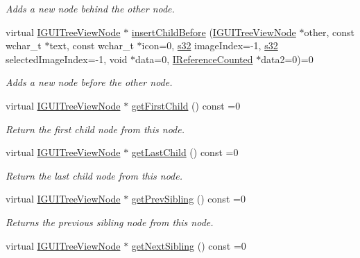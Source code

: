 \begin{DoxyCompactItemize}
\begin{DoxyCompactList}\small\item\em Adds a new node behind the other node. \end{DoxyCompactList}\item 
virtual \hyperlink{classirr_1_1gui_1_1IGUITreeViewNode}{I\+G\+U\+I\+Tree\+View\+Node} $\ast$ \hyperlink{classirr_1_1gui_1_1IGUITreeViewNode_adc7214ae72e9dae555348022b6568b7d}{insert\+Child\+Before} (\hyperlink{classirr_1_1gui_1_1IGUITreeViewNode}{I\+G\+U\+I\+Tree\+View\+Node} $\ast$other, const wchar\+\_\+t $\ast$text, const wchar\+\_\+t $\ast$icon=0, \hyperlink{namespaceirr_ac66849b7a6ed16e30ebede579f9b47c6}{s32} image\+Index=-\/1, \hyperlink{namespaceirr_ac66849b7a6ed16e30ebede579f9b47c6}{s32} selected\+Image\+Index=-\/1, void $\ast$data=0, \hyperlink{classirr_1_1IReferenceCounted}{I\+Reference\+Counted} $\ast$data2=0)=0
\begin{DoxyCompactList}\small\item\em Adds a new node before the other node. \end{DoxyCompactList}\item 
virtual \hyperlink{classirr_1_1gui_1_1IGUITreeViewNode}{I\+G\+U\+I\+Tree\+View\+Node} $\ast$ \hyperlink{classirr_1_1gui_1_1IGUITreeViewNode_a33cbd8c146ec27a4812548a32d81732b}{get\+First\+Child} () const =0
\begin{DoxyCompactList}\small\item\em Return the first child node from this node. \end{DoxyCompactList}\item 
virtual \hyperlink{classirr_1_1gui_1_1IGUITreeViewNode}{I\+G\+U\+I\+Tree\+View\+Node} $\ast$ \hyperlink{classirr_1_1gui_1_1IGUITreeViewNode_ad9f08dced84c88360485988af188e296}{get\+Last\+Child} () const =0
\begin{DoxyCompactList}\small\item\em Return the last child node from this node. \end{DoxyCompactList}\item 
virtual \hyperlink{classirr_1_1gui_1_1IGUITreeViewNode}{I\+G\+U\+I\+Tree\+View\+Node} $\ast$ \hyperlink{classirr_1_1gui_1_1IGUITreeViewNode_a41a756203d028a274586203091277aa9}{get\+Prev\+Sibling} () const =0
\begin{DoxyCompactList}\small\item\em Returns the previous sibling node from this node. \end{DoxyCompactList}\item 
virtual \hyperlink{classirr_1_1gui_1_1IGUITreeViewNode}{I\+G\+U\+I\+Tree\+View\+Node} $\ast$ \hyperlink{classirr_1_1gui_1_1IGUITreeViewNode_a5f54e1386055ad0b45775ebefb1b5600}{get\+Next\+Sibling} () const =0

\end{DoxyCompactItemize}

